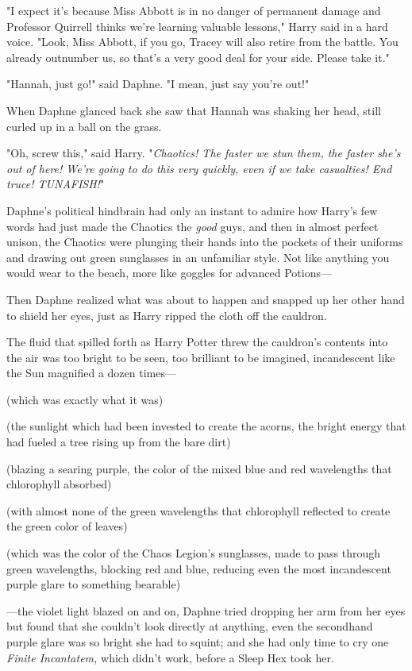 "I expect it's because Miss Abbott is in no danger of permanent damage and
Professor Quirrell thinks we're learning valuable lessons," Harry said in a
hard voice. "Look, Miss Abbott, if you go, Tracey will also retire from the
battle. You already outnumber us, so that's a very good deal for your side.
Please take it."

"Hannah, just go!" said Daphne. "I mean, just say you're out!"

When Daphne glanced back she saw that Hannah was shaking her head, still curled
up in a ball on the grass.

"Oh, screw this," said Harry. "\emph{Chaotics! The faster we stun them, the
faster she's out of here! We're going to do this very quickly, even if we take
casualties! End truce! TUNAFISH!}"

Daphne's political hindbrain had only an instant to admire how Harry's few
words had just made the Chaotics the \emph{good} guys, and then in almost
perfect unison, the Chaotics were plunging their hands into the pockets of
their uniforms and drawing out green sunglasses in an unfamiliar style. Not
like anything you would wear to the beach, more like goggles for advanced
Potions—

Then Daphne realized what was about to happen and snapped up her other hand to
shield her eyes, just as Harry ripped the cloth off the cauldron.

The fluid that spilled forth as Harry Potter threw the cauldron's contents into
the air was too bright to be seen, too brilliant to be imagined, incandescent
like the Sun magnified a dozen times—

(which was exactly what it was)

(the sunlight which had been invested to create the acorns, the bright energy
that had fueled a tree rising up from the bare dirt)

(blazing a searing purple, the color of the mixed blue and red wavelengths that
chlorophyll absorbed)

(with almost none of the green wavelengths that chlorophyll reflected to create
the green color of leaves)

(which was the color of the Chaos Legion's sunglasses, made to pass through
green wavelengths, blocking red and blue, reducing even the most incandescent
purple glare to something bearable)

—the violet light blazed on and on, Daphne tried dropping her arm from her
eyes but found that she couldn't look directly at anything, even the secondhand
purple glare was so bright she had to squint; and she had only time to cry one
\emph{Finite Incantatem,} which didn't work, before a Sleep Hex took her.

